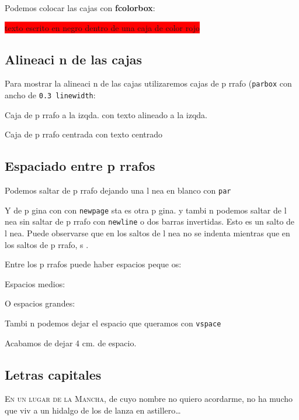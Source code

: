 \documentclass{article}
\begin{document}
Podemos colocar las cajas con \textbf{fcolorbox}:

\colorbox{red}{texto escrito en negro dentro de una caja de color rojo}
\\



\subsection{Alineaci n de las cajas}
\label{sec:alineacioncajas}

Para mostrar la alineaci n de las cajas utilizaremos cajas de p rrafo (\texttt{parbox} con ancho de \texttt{0.3 linewidth}:

\parbox[b]{0.3\linewidth}{\raggedright{Caja de p rrafo a la izqda. con texto alineado a la izqda.}}
\parbox[b]{0.3\linewidth}{\centering Caja de p rrafo centrada con texto centrado}
\parbox[b]{0.3\linewidth}{}

\subsection{Espaciado entre p rrafos}
\label{sec:espaciadoparrafos}

Podemos saltar de p rrafo dejando una l nea en blanco con \texttt{par}\par Y de p gina con con \texttt{newpage}\newpage{}
 sta es otra p gina. y tambi n podemos saltar de l nea sin saltar de p rrafo con \texttt{newline} o dos barras invertidas.\newline{} Esto es un salto de l nea. Puede observarse que en los saltos de l nea no se indenta mientras que en los saltos de p rrafo, s .

Entre los p rrafos puede haber espacios peque os:\smallskip{}

Espacios medios:
\medskip{}

O espacios grandes:
\bigskip{}

Tambi n podemos dejar el espacio que queramos con \texttt{vspace}\vspace{4cm}

Acabamos de dejar 4 cm. de espacio.
\subsection{Letras capitales}
\label{sec:letrascapitales}
\lettrine{E}{n un lugar de la Mancha}, de cuyo nombre no quiero acordarme, no ha mucho que viv a un hidalgo de los de lanza en astillero\ldots{}
\end{document}
